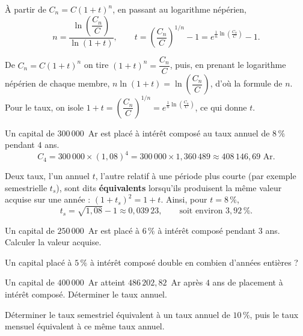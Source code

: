 \begin{propriete}
À partir de $C_{n} = C(1+t)^{n}$, en passant au logarithme népérien,
\[
  n = \frac{\ln\left(\dfrac{C_{n}}{C}\right)}{\ln(1+t)},
  \qquad
  t = \left(\frac{C_{n}}{C}\right)^{1/n}-1
    = e^{\frac1n\ln\left(\frac{C_{n}}{C}\right)}-1 .
\]
\end{propriete}

\begin{demonstration}
De $C_{n} = C(1+t)^{n}$ on tire $(1+t)^{n} = \dfrac{C_{n}}{C}$, puis, en
prenant le logarithme népérien de chaque membre,
$n\ln(1+t) = \ln\left(\dfrac{C_{n}}{C}\right)$, d'où la formule de $n$. Pour
le taux, on isole $1+t = \left(\dfrac{C_{n}}{C}\right)^{1/n}
= e^{\frac1n\ln\left(\frac{C_{n}}{C}\right)}$, ce qui donne $t$.
\end{demonstration}

\begin{exemple}
Un capital de $300\,000$~Ar est placé à intérêt composé au taux annuel de
$8\,\%$ pendant $4$ ans.
\[
  C_{4} = 300\,000 \times (1{,}08)^{4}
  = 300\,000 \times 1{,}360\,489 \approx 408\,146{,}69 \text{ Ar}.
\]
\end{exemple}

\begin{remarque}
Deux taux, l'un annuel $t$, l'autre relatif à une période plus courte (par
exemple semestrielle $t_{s}$), sont dits \textbf{équivalents} lorsqu'ils
produisent la même valeur acquise sur une année :
$(1+t_{s})^{2} = 1+t$. Ainsi, pour $t = 8\,\%$,
\[
  t_{s} = \sqrt{1{,}08}-1 \approx 0{,}039\,23,
  \qquad \text{soit environ } 3{,}92\,\%.
\]
\end{remarque}

\begin{entrainement}
\exo[\niveau{1}] Un capital de $250\,000$~Ar est placé à $6\,\%$ à intérêt
composé pendant $3$ ans. Calculer la valeur acquise.

\exo[\niveau{2}] Un capital placé à $5\,\%$ à intérêt composé double en
combien d'années entières ?

\exo[\niveau{2}] Un capital de $400\,000$~Ar atteint $486\,202{,}82$~Ar après
$4$ ans de placement à intérêt composé. Déterminer le taux annuel.

\exo[\niveau{3}] Déterminer le taux semestriel équivalent à un taux annuel de
$10\,\%$, puis le taux mensuel équivalent à ce même taux annuel.
\end{entrainement}

